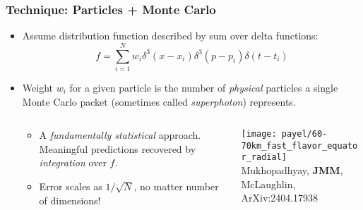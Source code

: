 \documentclass[]{beamer}
\begin{document}
\begin{frame}
  \frametitle{Technique: Particles + Monte Carlo}
  \begin{itemize}
  \item Assume distribution function described by sum over delta functions:
    $$f = \sum_{i=1}^N w_i \delta^3(x - x_i) \delta^3(p - p_i) \delta(t - t_i)$$
  \item Weight $w_i$ for a given particle is the number of
    \textit{physical} particles a single Monte Carlo packet (sometimes
    called \textit{superphoton}) represents.
    \begin{columns}
      \begin{column}{6.5cm}
        \vspace{-2cm}
        \begin{itemize}
        \item A \textit{fundamentally statistical} approach. Meaningful
          predictions recovered by \textit{integration} over $f$.
        \item Error scales as $1/\sqrt{N}$, no matter number of dimensions!
        \end{itemize}
      \end{column}
      \begin{column}{5.5cm}
        \begin{center}
          \texttt{[image: payel/60-70km\_fast\_flavor\_equator\_radial]}\\
          {\tiny Mukhopadhyay, \textbf{JMM}, McLaughlin, ArXiv:2404.17938}
        \end{center}
      \end{column}
    \end{columns}
\end{itemize}
\end{frame}
\end{document}
